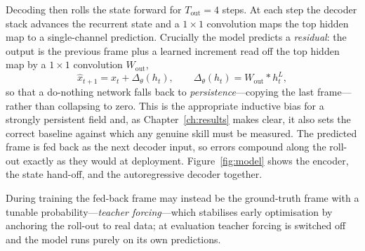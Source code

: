 Decoding then rolls the state forward for $T_{\text{out}}=4$ steps. At each step
the decoder stack advances the recurrent state and a $1\times1$ convolution maps
the top hidden map to a single-channel prediction. Crucially the model predicts a
\emph{residual}: the output is the previous frame plus a learned increment read
off the top hidden map by a $1\times1$ convolution $W_{\text{out}}$,
\begin{equation}
  \hat{x}_{t+1} = x_t + \Delta_\theta(h_t),
  \qquad \Delta_\theta(h_t) = W_{\text{out}} * h^{L}_t,
  \label{eq:residual}
\end{equation}
so that a do-nothing network falls back to \emph{persistence}---copying the last
frame---rather than collapsing to zero. This is the appropriate inductive bias
for a strongly persistent field and, as Chapter~\ref{ch:results} makes clear, it
also sets the correct baseline against which any genuine skill must be measured.
The predicted frame is fed back as the next decoder input, so errors compound
along the roll-out exactly as they would at deployment. Figure~\ref{fig:model}
shows the encoder, the state hand-off, and the autoregressive decoder together.



During training the fed-back frame may instead be the ground-truth frame with a
tunable probability---\emph{teacher forcing}---which stabilises early optimisation
by anchoring the roll-out to real data; at evaluation teacher forcing is switched
off and the model runs purely on its own predictions.

